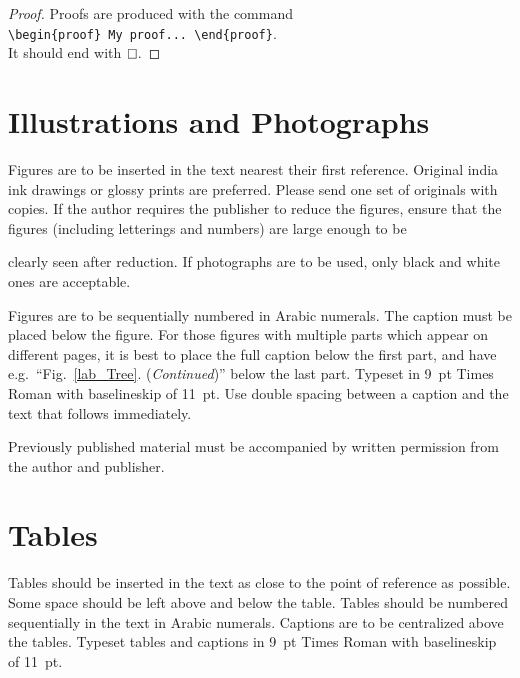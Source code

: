 \documentclass[11pt,twoside]{article}
\begin{document}
\begin{multicols}{2}
\begin{proof}
Proofs are produced with the command \\
\verb+\begin{proof} My proof... \end{proof}+.\\
It should end with\ $\qed$\kern0.3pt.
\end{proof}
\vspace*{-5pt}
\section{Illustrations and Photographs}

Figures are to be inserted in the text nearest their first reference. Original india ink drawings or glossy prints are preferred. Please send one set of originals with copies. If the author requires the publisher to reduce the figures, ensure that {the figures (including letterings and numbers) are large enough to be\hfilneg}




\noindent
clearly seen after reduction. If photographs are to be used, only black and white ones are acceptable.

Figures are to be sequentially numbered in Arabic numerals. The caption must be placed below the figure. For those figures with multiple parts which appear on different pages, it is best to place the full caption below the first part, and have e.g.~``Fig.~\ref{lab_Tree}. ({\it Continued})'' below the last part. Typeset in 9~pt Times Roman with baselineskip of 11~pt. Use double spacing between a caption and the text that follows immediately.

Previously published material must be accompanied by written permission from the author and publisher.

\section{Tables}

Tables should be inserted in the text as close to the point of reference as possible. Some space should be left above and below the table. Tables should be numbered sequentially in the text in Arabic numerals. Captions are to be centralized above the tables. Typeset tables and captions in 9~pt Times Roman with baselineskip of 11~pt.


\end{multicols}
\end{document}
